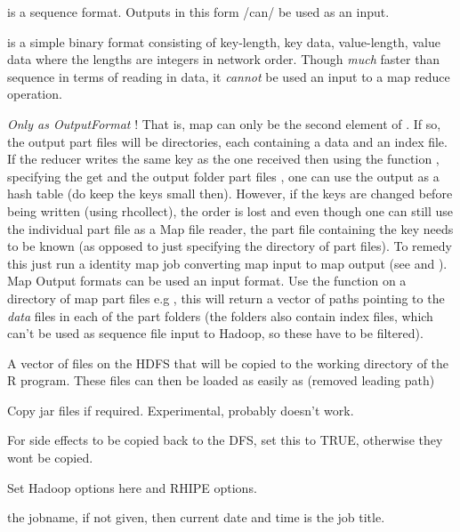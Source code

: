 \documentclass[letterpaper,10pt,english]{manual}
\begin{document}
\begin{description}
\begin{description}
\begin{description}
\end{description}

\item[\code{sequence}]
is a sequence format. Outputs in this form /can/ be used as an input.

\item[\code{binary}]
is a simple binary format consisting of key-length, key data, value-length, value data where the lengths are integers in network order. Though \emph{much} faster than sequence in terms of reading in data, it \emph{cannot} be used an input to a map reduce operation.

\item[\code{map}]
\emph{Only as OutputFormat} ! That is, map can only be the second element of . If so, the output part files will be directories, each containing a data and an index file. If the reducer writes the same key as the one received then using the function , specifying the get and the output folder part files , one can use the output as a hash table (do keep the keys small then). However, if the keys are changed before being written (using rhcollect), the order is lost and even though one can still use the individual part file as a Map file reader, the part file containing the key needs to be known (as opposed to just specifying the directory of part files). To remedy this just run a identity map job converting map input to map output (see  and ).
Map Output formats can be used an input format. Use the function  on a directory of map part files e.g , this will return a vector of paths pointing to the \emph{data} files in each of the part folders (the folders also contain index files, which can't be used as sequence file input to Hadoop, so these have to be filtered).

\item[\code{shared}]
A vector of files on the HDFS that will be copied to the working directory of the R program. These files can then be loaded as easily as  (removed leading path)

\end{description}

\item[\code{jarfiles}]
Copy jar files if required. Experimental, probably doesn't work.

\item[\code{copyFiles}]
For side effects to be copied back to the DFS, set this to TRUE, otherwise they wont be copied.

\item[\code{mapred}]
Set Hadoop options here and RHIPE options.

\item[\code{jobname}]
the jobname, if not given, then current date and time is the job title.

\end{description}
\end{document}
